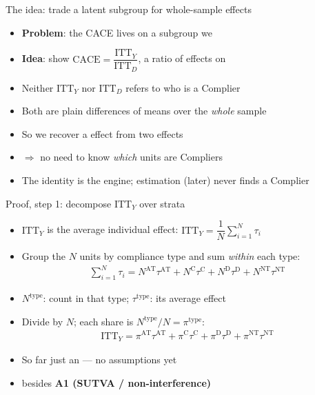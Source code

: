 \documentclass[table, xcolor = {dvipsnames}, 9pt]{beamer}
\theoremstyle{plain}
\newcommand{\mh}[1]{{\color{magenta}{#1}}}
\newcommand{\ITTY}{\mathrm{ITT}_Y}
\newcommand{\ITTD}{\mathrm{ITT}_D}
\newcommand{\CACE}{\mathrm{CACE}}
\begin{document}
\begin{frame}[t]{The idea: trade a latent subgroup for whole-sample effects}
\vfill
\begin{itemize} \vfill
\item \textbf{Problem}: the CACE lives on a subgroup we \mh{cannot identify} \vfill
\item \textbf{Idea}: show $\CACE = \dfrac{\ITTY}{\ITTD}$, a ratio of effects on \mh{all $N$ units} \vfill
\item Neither $\ITTY$ nor $\ITTD$ refers to who is a Complier \vfill
\item[] Both are plain differences of means over the \emph{whole} sample \vfill
\item So we recover a \mh{subgroup} effect from two \mh{whole-sample} effects \vfill
\item[] $\Rightarrow$ no need to know \emph{which} units are Compliers \vfill
\item The identity is the engine; estimation (later) never finds a Complier \vfill
\end{itemize} \vfill
\end{frame}
\begin{frame}[t]{Proof, step 1: decompose $\ITTY$ over strata}
\vfill
\begin{itemize} \vfill
\item $\ITTY$ is the average individual effect: $\ITTY = \dfrac{1}{N}\sum_{i=1}^{N} \tau_i$ \vfill
\item Group the $N$ units by compliance type and sum \emph{within} each type: \vfill
\begin{align*}
\sum_{i=1}^{N} \tau_i = N^{\textrm{AT}} \tau^{\textrm{AT}} + N^{\textrm{C}} \tau^{\textrm{C}} + N^{\textrm{D}} \tau^{\textrm{D}} + N^{\textrm{NT}} \tau^{\textrm{NT}}
\end{align*} \vfill
\item[] $N^{\textrm{type}}$: count in that type; $\tau^{\textrm{type}}$: its average effect \vfill
\item Divide by $N$; each share is $N^{\textrm{type}}/N = \pi^{\textrm{type}}$: \vfill
\begin{align*}
\ITTY = \pi^{\textrm{AT}} \tau^{\textrm{AT}} + \pi^{\textrm{C}} \tau^{\textrm{C}} + \pi^{\textrm{D}} \tau^{\textrm{D}} + \pi^{\textrm{NT}} \tau^{\textrm{NT}}
\end{align*} \vfill
\item So far just an \mh{accounting identity} --- no assumptions yet \vfill
\item[] besides \textbf{A1 (SUTVA / non-interference)} \vfill
\end{itemize} \vfill
\end{frame}
\end{document}
